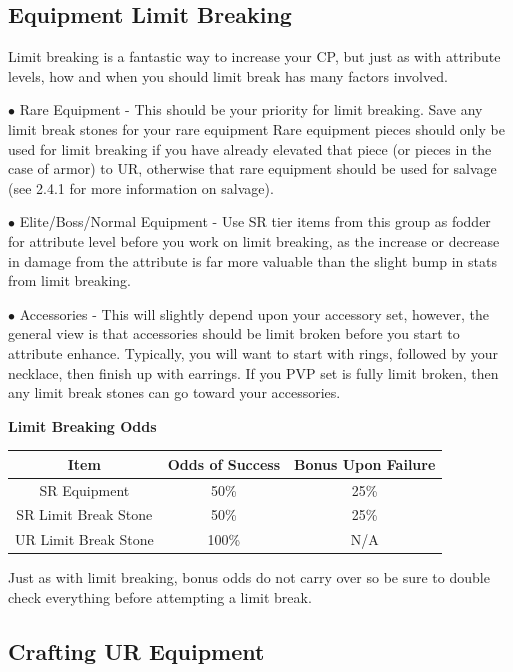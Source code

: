 \documentclass[]{article}
\begin{document}
\subsection{Equipment Limit Breaking}

Limit breaking is a fantastic way to increase your CP, but just as with attribute levels, how and when you should limit break has many factors involved.

$\bullet$ Rare Equipment - This should be your priority for limit breaking.
Save any limit break stones for your rare equipment
Rare equipment pieces should only be used for limit breaking if you have already elevated that piece (or pieces in the case of armor) to UR, otherwise that rare equipment should be used for salvage (see 2.4.1 for more information on salvage).

$\bullet$ Elite/Boss/Normal Equipment - Use SR tier items from this group as fodder for attribute level before you work on limit breaking, as the increase or decrease in damage from the attribute is far more valuable than the slight bump in stats from limit breaking.

$\bullet$ Accessories - This will slightly depend upon your accessory set, however, the general view is that accessories should be limit broken before you start to attribute enhance. 
Typically, you will want to start with rings, followed by your necklace, then finish up with earrings.
If you PVP set is fully limit broken, then any limit break stones can go toward your accessories.

\begin{center}
	\textbf{Limit Breaking Odds}\\
	\begin{tabular}{|c|c|c|}
		\hline 
		Item & Odds of Success & Bonus Upon Failure \\ 
		\hline 
		SR Equipment & 50\% & 25\% \\ 
		SR Limit Break Stone & 50\% & 25\% \\ 
		UR Limit Break Stone & 100\% & N/A \\ 
		\hline 
	\end{tabular} 
\end{center}

Just as with limit breaking, bonus odds do not carry over so be sure to double check everything before attempting a limit break.

\subsection{Crafting UR Equipment}
\end{document}
